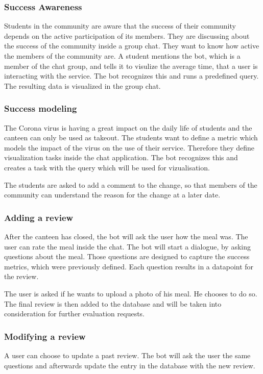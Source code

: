 \subsubsection{Success Awareness} Students in the community are aware that the success of their community depends on the active participation of its members. They are discussing about the success of the community inside a group chat. They want to know how active the members of the community are. A student mentions the bot, which is a member of the chat group, and tells it to visulize the  average time, that a user is interacting with the service. The bot recognizes this and runs a predefined query. The resulting data is visualized in the group chat.

\subsubsection{Success modeling} The Corona virus is having a great impact on the daily life of students and the canteen can only be used as takeout. The students want to define a metric which models the impact of the virus on the use of their service. Therefore they define visualization tasks inside the chat application. The bot recognizes this and creates a task with the query which will be used for vizualisation.

The students are asked to add a comment to the change, so that members of the community can understand the reason for the change at a later date.

\subsubsection{Adding a review} After the canteen has closed, the bot will ask the user how the meal was. The user can rate the meal inside the chat. The bot will start a dialogue, by asking questions about the meal. Those questions are designed to capture the success metrics, which were previously defined. Each question results in a datapoint for the review.

The user is asked if he wants to upload a photo of his meal. He chooses to do so. The final review is then added to the database and will be taken into consideration for further evaluation requests.

\subsubsection{Modifying a review} A user can choose to update a past review. The bot will ask the user the same questions and afterwards update the entry in the database with the new review.

